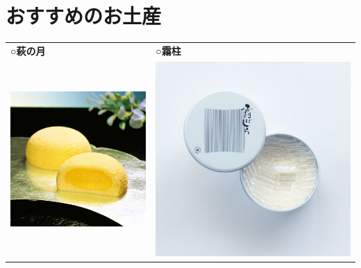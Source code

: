 \section{おすすめのお土産}

\begin{table}[H]
	\begin{tabular}{ll}
		\textbf{○萩の月} & \textbf{○霜柱} \\
		\begin{minipage}{0.45\textwidth}
			\centering
			\includegraphics[width=0.7\linewidth]{img/haginotuki}
		\end{minipage} &
		\begin{minipage}{0.45\textwidth}
			\centering
			\includegraphics[width=0.7\linewidth]{img/simobashira}
		\end{minipage} \\

\end{tabular}
\end{table}
